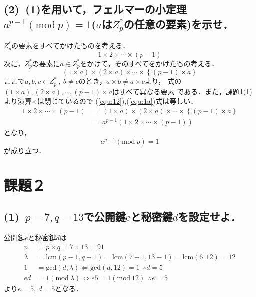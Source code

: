 \documentclass[a4paper,12pt]{jarticle}
\begin{document}
\subsection*{(2)~(1)を用いて，フェルマーの小定理$a^{p-1}(\mathrm{mod}~p)=1$($a$は$Z_p^*$の任意の要素)を示せ．}
%
%
$Z_p^*$の要素をすべてかけたものを考える．
%
\begin{equation} \label{equ:12}
 1 \times 2 \times \cdots \times (p-1) 
\end{equation}
%
次に，$Z_p^*$の要素に$a\in Z_p^*$をかけて，そのすべてをかけたもの考える．
%
\begin{equation} \label{equ:1a}
 (1 \times a)\times (2 \times a)
  \times \cdots \times \left\{ (p-1) \times a\right\}
\end{equation}
%
ここで$a,b,c\in Z_p^*~,~b\neq c$のとき，$a \times b \neq a \times c$より，
式の$(1 \times a),(2 \times a),\cdots,(p-1) \times a$はすべて異なる要素
である．また，課題1(1)より演算$\times$は閉じているので
(\ref{equ:12}),(\ref{equ:1a})式は等しい．
%
\begin{eqnarray}
 1 \times 2 \times \cdots \times (p-1) &=& (1 \times a)\times (2 \times a)
  \times \cdots \times \left\{ (p-1) \times a\right\} \\
&=&a^{p-1}(1 \times 2 \times \cdots \times (p-1))
\end{eqnarray}
%
となり，
%
\begin{equation}
 a^{p-1} (\mathrm{mod}~p)=1
\end{equation}
%
が成り立つ．
\vspace{-10mm}
\section*{課題２}
\vspace{-3mm}
\subsection*{(1)~$p=7,q=13$で公開鍵$e$と秘密鍵$d$を設定せよ．}
公開鍵$e$と秘密鍵$d$は
%
\begin{align*}
  n&=p \times q = 7 \times 13 = 91 \\
 \lambda &= \mathrm{lcm}(p-1,q-1) = \mathrm{lcm}(7-1,13-1) =\mathrm{lcm}(6,12)=12 \\
 1&=\mathrm{gcd}(d,\lambda) \iff \mathrm{gcd}(d,12)=1 ~~\therefore d=5\\
 ed &= 1(\mathrm{mod}~\lambda) \iff e5=1(\mathrm{mod}~12) ~~\therefore e=5
\end{align*}
%
より$e=5,~d=5$となる．
\vspace{-6mm}
\end{document}

